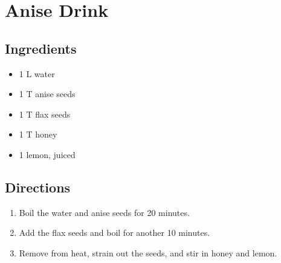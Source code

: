 \documentclass[letterpaper,10pt,english]{sphinxmanual}
\begin{document}
\chapter{Anise Drink}
\label{anise_drink:anise-drink}\label{anise_drink::doc}

\section{Ingredients}
\label{anise_drink:ingredients}\begin{itemize}
\item {} 
1   L   water

\item {} 
1   T   anise seeds

\item {} 
1   T   flax seeds

\item {} 
1   T   honey

\item {} 
1       lemon, juiced

\end{itemize}


\section{Directions}
\label{anise_drink:directions}\begin{enumerate}
\item {} 
Boil the water and anise seeds for 20 minutes.

\item {} 
Add the flax seeds and boil for another 10 minutes.

\item {} 
Remove from heat, strain out the seeds, and stir in honey and lemon.

\end{enumerate}
\end{document}
